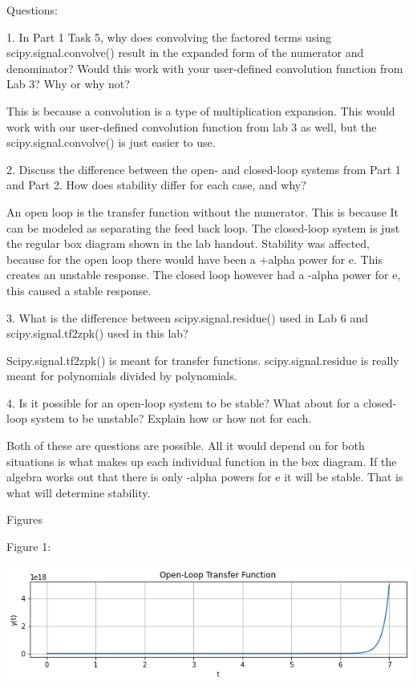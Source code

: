 \documentclass[nobib]{MSword}
\begin{document}
\begin{center}
    Questions:
\end{center}
1. In Part 1 Task 5, why does convolving the factored terms using scipy.signal.convolve() result in the expanded form of the numerator and denominator? Would this work with your user-defined convolution function from Lab 3? Why or why not?

This is because a convolution is a type of multiplication expansion. This would work with our user-defined convolution function from lab 3 as well, but the scipy.signal.convolve() is just easier to use.

2. Discuss the difference between the open- and closed-loop systems from Part 1 and Part 2. How does stability differ for each case, and why?

An open loop is the transfer function without the numerator. This is because It can be modeled as separating the feed back loop. The closed-loop system is just the regular box diagram shown in the lab handout. Stability was affected, because for the open loop there would have been a +alpha power for e. This creates an unstable response. The closed loop however had a -alpha power for e, this caused a stable response.

3. What is the difference between scipy.signal.residue() used in Lab 6 and
scipy.signal.tf2zpk() used in this lab?

Scipy.signal.tf2zpk() is meant for transfer functions. scipy.signal.residue is really meant for polynomials divided by polynomials.

4. Is it possible for an open-loop system to be stable? What about for a closed-loop system to be unstable? Explain how or how not for each.

Both of these are questions are possible. All it would depend on for both situations is what makes up each individual function in the box diagram. If the algebra works out that there is only -alpha powers for e it will be stable. That is what will determine stability.


\begin{center}
    Figures
\end{center}

Figure 1:

\includegraphics[scale = 0.75]
{txt/Lab7Fig1.png}
\end{document}

